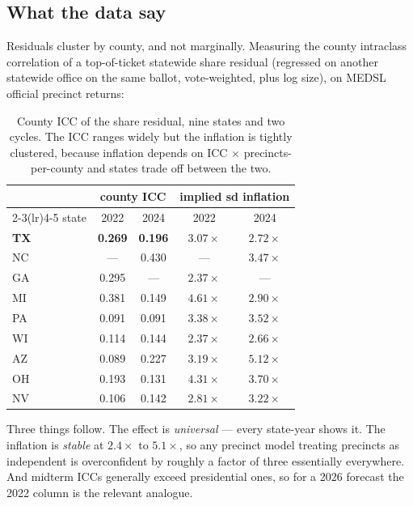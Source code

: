 \documentclass[11pt]{article}
\begin{document}
\subsection{What the data say}

Residuals cluster by county, and not marginally. Measuring the county intraclass
correlation of a top-of-ticket statewide share residual (regressed on another statewide
office on the same ballot, vote-weighted, plus log size), on MEDSL official precinct
returns:

\begin{table}[ht]
\centering
\small
\begin{tabular}{@{}lcccc@{}}
\toprule
 & \multicolumn{2}{c}{county ICC} & \multicolumn{2}{c}{implied sd inflation} \\
\cmidrule(lr){2-3}\cmidrule(lr){4-5}
state & 2022 & 2024 & 2022 & 2024 \\
\midrule
\textbf{TX} & \textbf{0.269} & \textbf{0.196} & $3.07\times$ & $2.72\times$ \\
NC & --- & 0.430 & --- & $3.47\times$ \\
GA & 0.295 & --- & $2.37\times$ & --- \\
MI & 0.381 & 0.149 & $4.61\times$ & $2.90\times$ \\
PA & 0.091 & 0.091 & $3.38\times$ & $3.52\times$ \\
WI & 0.114 & 0.144 & $2.37\times$ & $2.66\times$ \\
AZ & 0.089 & 0.227 & $3.19\times$ & $5.12\times$ \\
OH & 0.193 & 0.131 & $4.31\times$ & $3.70\times$ \\
NV & 0.106 & 0.142 & $2.81\times$ & $3.22\times$ \\
\bottomrule
\end{tabular}
\caption{County ICC of the share residual, nine states and two cycles. The ICC ranges
widely but the inflation is tightly clustered, because inflation depends on ICC $\times$
precincts-per-county and states trade off between the two.}
\label{tab:icc}
\end{table}

\noindent Three things follow. The effect is \emph{universal} --- every state-year shows
it. The inflation is \emph{stable} at $2.4\times$ to $5.1\times$, so any precinct model
treating precincts as independent is overconfident by roughly a factor of three
essentially everywhere. And midterm ICCs generally exceed presidential ones, so for a 2026
forecast the 2022 column is the relevant analogue.
\end{document}
